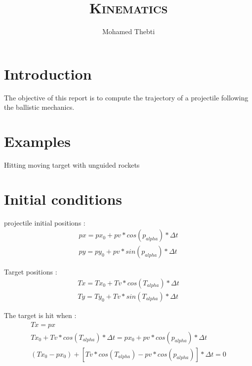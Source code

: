 \documentclass[12pt,a4paper]{article}
\title{
	\Huge\textsc{Kinematics}
}
\author{Mohamed Thebti}
\begin{document}
\setlength{\parindent}{0mm}

\fancyhead[R]{\slshape \leftmark}

\fancyfoot[C]{}
\fancyfoot[R]{\thepage}

\maketitle
\newpage

\tableofcontents

\newpage



\section{Introduction}

The objective of this report is to compute the trajectory of a projectile following the ballistic mechanics. 


\section{Examples}

Hitting moving target with unguided rockets



\section{Initial conditions}

projectile initial positions : 
\begin{eqnarray}
	px = px_0 + pv * cos(p_{alpha}) * \Delta t\\
	py = py_0 + pv * sin(p_{alpha}) * \Delta t
\end{eqnarray}

Target positions : 
\begin{eqnarray}
	Tx = Tx_0 + Tv * cos(T_{alpha}) * \Delta t\\
	Ty = Ty_0 + Tv * sin(T_{alpha}) * \Delta t
\end{eqnarray}

The target is hit when :
\begin{eqnarray}
	Tx = px\\
	Tx_0 + Tv * cos(T_{alpha}) * \Delta t = px_0 + pv * cos(p_{alpha}) * \Delta t\\
	(Tx_0 - px_0) + [Tv * cos(T_{alpha})-pv * cos(p_{alpha}) ] * \Delta t =  0
\end{eqnarray}
\end{document}
